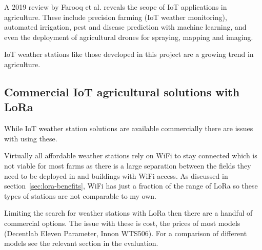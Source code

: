 A 2019 review by Farooq et al. \cite{farooq2019iot} reveals the scope of IoT
applications in agriculture. These include precision farming (IoT weather
monitoring), automated irrigation, pest and disease prediction with machine
learning, and even the deployment of agricultural drones for spraying, mapping
and imaging. 

IoT weather stations like those developed in this project are a growing trend in
agriculture.

\subsection{Commercial IoT agricultural solutions with LoRa}

While IoT weather station solutions are available commercially there are issues
with using these. 

Virtually all affordable weather stations rely on WiFi to stay connected which
is not viable for most farms as there is a large separation between the fields
they need to be deployed in and buildings with WiFi access. As discussed in
section~\ref{sec:lora-benefits}, WiFi has just a fraction of the range of LoRa
so these types of stations are not comparable to my own.

Limiting the search for weather stations with LoRa then there are a handful of
commercial options. The issue with these is cost, the prices of most models
(Decentlab Eleven Parameter, Innon WTS506). For a comparison of different
models see the relevant section in the evaluation.

